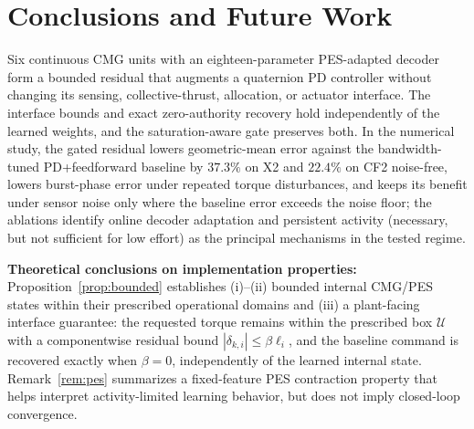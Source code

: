 \documentclass[letterpaper, 10 pt, conference]{ieeeconf}
\begin{document}


\section{Conclusions and Future Work}
\label{sec:conclusion}

Six continuous CMG units with an eighteen-parameter PES-adapted decoder form a bounded residual that augments a quaternion PD controller without changing its sensing, collective-thrust, allocation, or actuator interface. The interface bounds and exact zero-authority recovery hold independently of the learned weights, and the saturation-aware gate preserves both. In the numerical study, the gated residual lowers geometric-mean error against the bandwidth-tuned PD+feedforward baseline by $37.3\%$ on X2 and $22.4\%$ on CF2 noise-free, lowers burst-phase error under repeated torque disturbances, and keeps its benefit under sensor noise only where the baseline error exceeds the noise floor; the ablations identify online decoder adaptation and persistent activity (necessary, but not sufficient for low effort) as the principal mechanisms in the tested regime.

\noindent\textbf{Theoretical conclusions on implementation properties:} Proposition~\ref{prop:bounded} establishes (i)--(ii) bounded internal CMG/PES states within their prescribed operational domains and (iii) a plant-facing interface guarantee: the requested torque remains within the prescribed box $\mathcal U$ with a componentwise residual bound $|\delta_{k,i}|\le\beta\ell_i$, and the baseline command is recovered exactly when $\beta=0$, independently of the learned internal state. Remark~\ref{rem:pes} summarizes a fixed-feature PES contraction property that helps interpret activity-limited learning behavior, but does not imply closed-loop convergence.
\end{document}
